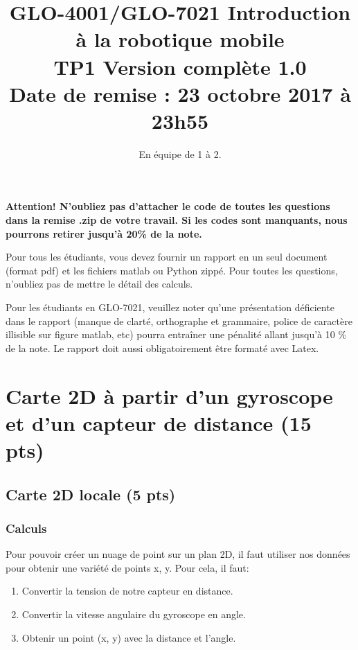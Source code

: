 \documentclass[12pt]{article}
\begin{document}
\title{GLO-4001/GLO-7021 Introduction à la robotique mobile \\  TP1 Version complète 1.0 \\ Date de remise : 23 octobre 2017 à 23h55}
\author{En équipe de 1 à 2.}
\maketitle


{\bf Attention! N'oubliez pas d'attacher le code de toutes les questions dans la remise .zip de votre travail. Si les codes sont manquants, nous pourrons retirer jusqu'à 20\% de la note. }

Pour tous les étudiants, vous devez fournir un rapport en un seul document (format pdf) et les fichiers matlab ou Python zippé. Pour toutes les questions, n'oubliez pas de mettre le détail des calculs.

Pour les étudiants en GLO-7021, veuillez noter qu'une présentation déficiente dans le rapport (manque de clarté, orthographe et grammaire, police de caractère illisible sur figure matlab, etc) pourra entraîner une pénalité allant jusqu'à 10 \% de la note. Le rapport doit aussi obligatoirement être formaté avec Latex.


\section{Carte 2D à partir d'un gyroscope et d'un capteur de distance (15 pts)}

\subsection{Carte 2D locale (5 pts)}
\label{CarteLocale}

\subsubsection{Calculs}
Pour pouvoir créer un nuage de point sur un plan 2D, il faut utiliser nos données pour obtenir une variété de points x, y.
Pour cela, il faut:
\begin{enumerate}
        \item Convertir la tension de notre capteur en distance.
        \item Convertir la vitesse angulaire du gyroscope en angle.
        \item Obtenir un point (x, y) avec la distance et l'angle.
\end{enumerate}
\end{document}
